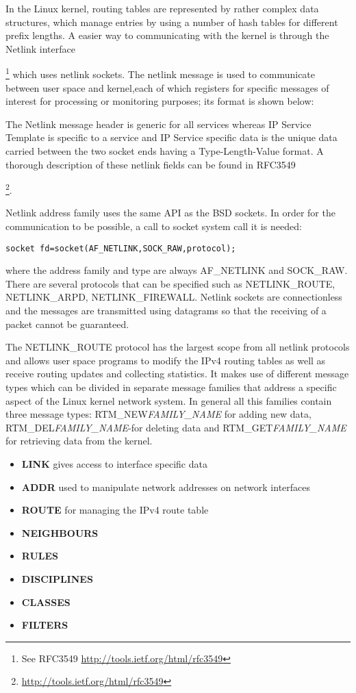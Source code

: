 In the Linux kernel, routing tables are represented by rather complex data structures, which manage entries by using a number of hash tables for different prefix lengths. A easier way to communicating with the kernel is through the Netlink interface{\footnote{See RFC3549 \url{http://tools.ietf.org/html/rfc3549}} which uses netlink sockets.
The netlink message is used to communicate between user space and kernel,each of which registers for specific messages of interest for processing or monitoring purposes; its format is shown below:

The Netlink message header is generic for all services whereas IP Service Template is specific to a service and IP Service specific data is the unique data carried between the two socket ends having a Type-Length-Value format. A thorough description of these netlink fields can be found in RFC3549 {\footnote{\url{http://tools.ietf.org/html/rfc3549}}.

Netlink address family uses the same API as the BSD sockets. In order for the communication to be possible, a call to socket system call it is needed:
\begin{lstlisting}
socket fd=socket(AF_NETLINK,SOCK_RAW,protocol);
\end{lstlisting}
where the address family and type are always AF_NETLINK and SOCK_RAW. There are several protocols that can be specified such as NETLINK_ROUTE, NETLINK_ARPD, NETLINK_FIREWALL.
Netlink sockets are connectionless and the messages are transmitted using datagrams so that the receiving of a packet cannot be guaranteed.

The NETLINK_ROUTE protocol has the largest scope from all netlink protocols and allows user space programs to modify the IPv4 routing tables as well as receive routing updates and collecting statistics. It makes use of  different message types which can be divided in separate message families that address a specific aspect of the Linux kernel network system. In general all this families contain three message types: RTM_NEW\textit{FAMILY_NAME} for adding new data, RTM_DEL\textit{FAMILY_NAME}-for deleting data and RTM_GET\textit{FAMILY_NAME} for retrieving data from the kernel.
\begin{itemize}
\item{\bf LINK} gives access to interface specific data
\item{\bf ADDR} used to manipulate network addresses on network interfaces
\item{\bf ROUTE} for managing the IPv4 route table
\item{\bf NEIGHBOURS}
\item{\bf RULES}
\item{\bf DISCIPLINES}
\item{\bf CLASSES}
\item{\bf FILTERS}
\end{itemize} 

}}
